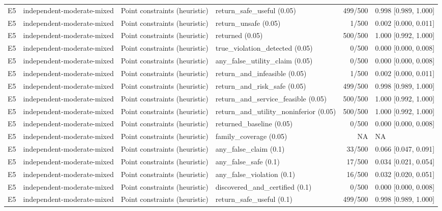 \begin{longtable}{p{.04\linewidth}p{.18\linewidth}p{.19\linewidth}p{.16\linewidth}r p{.21\linewidth}}
E5 & independent-moderate-mixed & Point constraints (heuristic) & return\_safe\_useful (0.05) & 499/500 & 0.998 [0.989, 1.000]\\
E5 & independent-moderate-mixed & Point constraints (heuristic) & return\_unsafe (0.05) & 1/500 & 0.002 [0.000, 0.011]\\
E5 & independent-moderate-mixed & Point constraints (heuristic) & returned (0.05) & 500/500 & 1.000 [0.992, 1.000]\\
E5 & independent-moderate-mixed & Point constraints (heuristic) & true\_violation\_detected (0.05) & 0/500 & 0.000 [0.000, 0.008]\\
E5 & independent-moderate-mixed & Point constraints (heuristic) & any\_false\_utility\_claim (0.05) & 0/500 & 0.000 [0.000, 0.008]\\
E5 & independent-moderate-mixed & Point constraints (heuristic) & return\_and\_infeasible (0.05) & 1/500 & 0.002 [0.000, 0.011]\\
E5 & independent-moderate-mixed & Point constraints (heuristic) & return\_and\_risk\_safe (0.05) & 499/500 & 0.998 [0.989, 1.000]\\
E5 & independent-moderate-mixed & Point constraints (heuristic) & return\_and\_service\_feasible (0.05) & 500/500 & 1.000 [0.992, 1.000]\\
E5 & independent-moderate-mixed & Point constraints (heuristic) & return\_and\_utility\_noninferior (0.05) & 500/500 & 1.000 [0.992, 1.000]\\
E5 & independent-moderate-mixed & Point constraints (heuristic) & returned\_baseline (0.05) & 0/500 & 0.000 [0.000, 0.008]\\
E5 & independent-moderate-mixed & Point constraints (heuristic) & family\_coverage (0.05) & NA & NA\\
E5 & independent-moderate-mixed & Point constraints (heuristic) & any\_false\_claim (0.1) & 33/500 & 0.066 [0.047, 0.091]\\
E5 & independent-moderate-mixed & Point constraints (heuristic) & any\_false\_safe (0.1) & 17/500 & 0.034 [0.021, 0.054]\\
E5 & independent-moderate-mixed & Point constraints (heuristic) & any\_false\_violation (0.1) & 16/500 & 0.032 [0.020, 0.051]\\
E5 & independent-moderate-mixed & Point constraints (heuristic) & discovered\_and\_certified (0.1) & 0/500 & 0.000 [0.000, 0.008]\\
E5 & independent-moderate-mixed & Point constraints (heuristic) & return\_safe\_useful (0.1) & 499/500 & 0.998 [0.989, 1.000]\\

\end{longtable}
